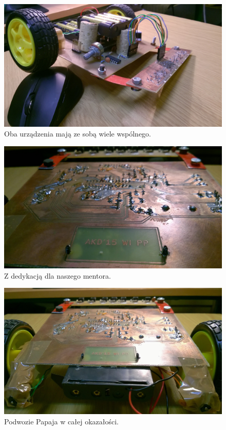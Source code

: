 \documentclass{article}
\begin{document}
\begin{figure}[!htbp]
\centering
\includegraphics[scale=0.24]{./focie/oparcie_2.jpg}
\caption{Oba urządzenia mają ze sobą wiele wspólnego.}
\end{figure}

\begin{figure}[!htbp]
\centering
\includegraphics[scale=0.24]{./focie/dedykacja.jpg}
\caption{Z dedykacją dla naszego mentora.}
\end{figure}

\begin{figure}[!htbp]
\centering
\includegraphics[scale=0.24]{./focie/spod_papaja.jpg}
\caption{Podwozie Papaja w całej okazałości.}
\end{figure}
\end{document}
